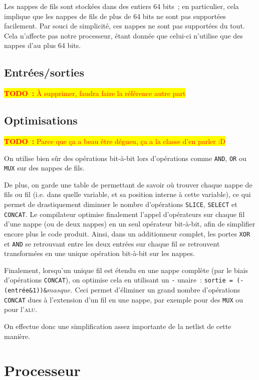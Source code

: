 \documentclass[11pt,a4paper]{article}
\newcommand{\todo}[1]{\colorbox{yellow}{\textcolor{red}{\textbf{TODO~:} #1}}}
\begin{document}
Les nappes de fils sont stockées dans des entiers 64 bits~; en
particulier, cela implique que les nappes de fils de plus de 64 bits
ne sont pas supportées facilement. Par souci de simplicité, ces nappes
ne sont pas supportées du tout. Cela n'affecte pas notre processeur,
étant donnée que celui-ci n'utilise que des nappes d'au plus 64 bits.

\subsection{Entrées/sorties} \label{ssec:compilo_io}
\todo{À supprimer, faudra faire la référence autre part}

\subsection{Optimisations}
\todo{Parce que ça a beau être dégueu, ça a la classe d'en parler :D}

On utilise bien sûr des opérations bit-à-bit lors d'opérations comme
\verb!AND!, \verb!OR! ou \verb!MUX! sur des nappes de fils.

De plus, on garde une table de permettant de savoir où trouver chaque
nappe de fils ou fil (i.e. dans quelle variable, et sa position
interne à cette variable), ce qui permet de drastiquement diminuer le
nombre d'opérations \verb!SLICE!, \verb!SELECT! et \verb!CONCAT!. Le
compilateur optimise finalement l'appel d'opérateurs sur chaque fil
d'une nappe (ou de deux nappes) en un seul opérateur bit-à-bit, afin
de simplifier encore plus le code produit. Ainsi, dans un additionneur
complet, les portes \verb!XOR! et \verb!AND! se retrouvant entre les
deux entrées sur chaque fil se retrouvent transformées en une unique
opération bit-à-bit sur les nappes.

Finalement, lorsqu'un unique fil est étendu en une nappe complète (par
le biais d'opérations \verb!CONCAT!), on optimise cela en utilisant un
\verb!-! unaire~: \verb!sortie = (-(entrée&1))&!$masque$. Ceci permet
d'éliminer un grand nombre d'opérations \verb!CONCAT! dues à
l'extension d'un fil en une nappe, par exemple pour des \verb!MUX! ou
pour l'\textsc{alu}.

On effectue donc une simplification assez importante de la netlist de cette manière.


\section{Processeur} \label{sec:proc}
\end{document}
